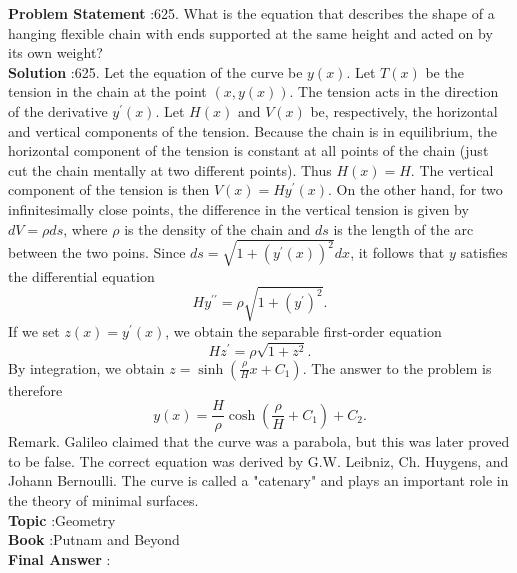 \documentclass[10pt]{article}
\begin{document}
\textbf{Problem Statement} :625. What is the equation that describes the shape of a hanging flexible chain with ends supported at the same height and acted on by its own weight?\\
\textbf{Solution} :625. Let the equation of the curve be $y(x)$. Let $T(x)$ be the tension in the chain at the point $(x, y(x))$. The tension acts in the direction of the derivative $y^{\prime}(x)$. Let $H(x)$ and $V(x)$ be, respectively, the horizontal and vertical components of the tension. Because the chain is in equilibrium, the horizontal component of the tension is constant at all points of the chain (just cut the chain mentally at two different points). Thus $H(x)=H$. The vertical component of the tension is then $V(x)=H y^{\prime}(x)$. On the other hand, for two infinitesimally close points, the difference in the vertical tension is given by $d V=\rho d s$, where $\rho$ is the density of the chain and $d s$ is the length of the arc between the two poins. Since $d s=\sqrt{1+\left(y^{\prime}(x)\right)^{2}} d x$, it follows that $y$ satisfies the differential equation$$ H y^{\prime \prime}=\rho \sqrt{1+\left(y^{\prime}\right)^{2}} . $$If we set $z(x)=y^{\prime}(x)$, we obtain the separable first-order equation$$ H z^{\prime}=\rho \sqrt{1+z^{2}} . $$By integration, we obtain $z=\sinh \left(\frac{\rho}{H} x+C_{1}\right)$. The answer to the problem is therefore$$ y(x)=\frac{H}{\rho} \cosh \left(\frac{\rho}{H}+C_{1}\right)+C_{2} . $$Remark. Galileo claimed that the curve was a parabola, but this was later proved to be false. The correct equation was derived by G.W. Leibniz, Ch. Huygens, and Johann Bernoulli. The curve is called a "catenary" and plays an important role in the theory of minimal surfaces.\\
\textbf{Topic} :Geometry\\
\textbf{Book} :Putnam and Beyond\\
\textbf{Final Answer} :\\
\end{document}
